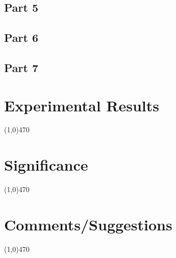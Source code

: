 \documentclass[12pt]{article}
\begin{document}
	\subsection{Part 5}
	
	\subsection{Part 6}
	
	\subsection{Part 7}

			
\section{Experimental Results}\vspace{-.7cm} \line(1,0){470}


			
\section{Significance} \vspace{-.7cm} \line(1,0){470}
	\paragraph{}
		

 \section{Comments/Suggestions}\vspace{-.7cm} \line(1,0){470}
 	\paragraph{}

		
\end{document}
